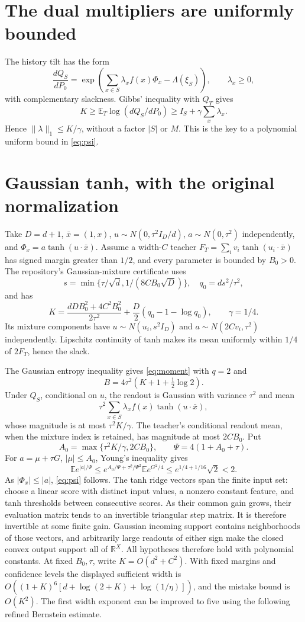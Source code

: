 \documentclass[11pt]{article}
\newcommand{\E}{\mathbb E}
\newcommand{\R}{\mathbb R}
\begin{document}
\section{The dual multipliers are uniformly bounded}
The history tilt has the form
\[
 \frac{dQ_S}{dP_0}=
 \exp\left(\sum_{x\in S}\lambda_x f(x)\Phi_x-\Lambda(\xi_S)\right),
 \qquad \lambda_x\ge0,
\]
with complementary slackness. Gibbs' inequality with $Q_T$ gives
\[
 K\ge\E_T\log(dQ_S/dP_0)
 \ge I_S+\gamma\sum_x\lambda_x.
\]
Hence $\|\lambda\|_1\le K/\gamma$, without a factor $|S|$ or $M$.
This is the key to a polynomial uniform bound in \eqref{eq:psi}.

\section{Gaussian tanh, with the original normalization}
Take $D=d+1$, $\bar x=(1,x)$, $u\sim N(0,\tau^2I_D/d)$,
$a\sim N(0,\tau^2)$ independently, and $\Phi_x=a\tanh(u\cdot\bar x)$.
Assume a width-$C$ teacher $F_T=\sum_i v_i\tanh(u_i\cdot\bar x)$ has
signed margin greater than $1/2$, and every parameter is bounded by
$B_0>0$. The repository's Gaussian-mixture certificate uses
\[
 s=\min\{\tau/\sqrt d,1/(8CB_0\sqrt D)\},\quad q_0=ds^2/\tau^2,
\]
and has
\[
 K=\frac{dDB_0^2+4C^2B_0^2}{2\tau^2}
       +\frac D2(q_0-1-\log q_0),\qquad\gamma=1/4.
\]
Its mixture components have $u\sim N(u_i,s^2I_D)$ and
$a\sim N(2Cv_i,\tau^2)$ independently. Lipschitz continuity of tanh
makes its mean uniformly within $1/4$ of $2F_T$, hence the slack.

The Gaussian entropy inequality gives \eqref{eq:moment} with $q=2$ and
\[
 B=4\tau^2(K+1+\tfrac12\log2).
\]
Under $Q_S$, conditional on $u$, the readout is Gaussian with variance
$\tau^2$ and mean
\[
 \tau^2\sum_{x\in S}\lambda_x f(x)\tanh(u\cdot\bar x),
\]
whose magnitude is
at most $\tau^2K/\gamma$. The teacher's conditional readout mean, when
the mixture index is retained, has magnitude at most $2CB_0$. Put
\[
 A_0=\max\{\tau^2K/\gamma,2CB_0\},\qquad
 \Psi=4(1+A_0+\tau).
\]
For $a=\mu+\tau G$, $|\mu|\le A_0$, Young's inequality gives
\[
 \E e^{|a|/\Psi}
 \le e^{A_0/\Psi+\tau^2/\Psi^2}\E e^{G^2/4}
 \le e^{1/4+1/16}\sqrt2<2.
\]
As $|\Phi_x|\le|a|$, \eqref{eq:psi} follows. The tanh ridge vectors span the finite input set: choose a linear score
with distinct input values, a nonzero constant feature, and tanh thresholds
between consecutive scores. As their common gain grows, their evaluation
matrix tends to an invertible triangular step matrix. It is therefore
invertible at some finite gain. Gaussian incoming support contains
neighborhoods of those vectors, and arbitrarily large readouts of either
sign make the closed convex output support all of $\R^X$.
All hypotheses therefore
hold with polynomial constants. At fixed $B_0,\tau$, write
$K=O(d^2+C^2)$. With fixed margins and confidence levels the displayed
sufficient width is $O((1+K)^6[d+\log(2+K)+\log(1/\eta)])$, and the
mistake bound is $O(K^2)$. The first width exponent can be improved to
five using the following refined Bernstein estimate.
\end{document}
